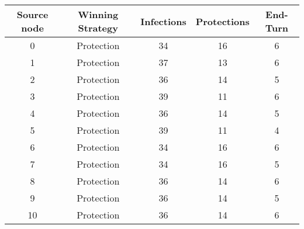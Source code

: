 \documentclass[results.tex]{subfiles}
\begin{document}
    \begin{center}
        \begin{tabular}{| c || c | c | c | c |}
            \hline
            {\bfseries Source node} & {\bfseries Winning Strategy} & {\bfseries Infections} & {\bfseries Protections}
            & {\bfseries End-Turn}
            \\  %
            \hline\hline
            0                       & Protection                   & 34                     & 16                      & 6                    \\
            \hline
            1                       & Protection                   & 37                     & 13                      & 6                    \\
            \hline
            2                       & Protection                   & 36                     & 14                      & 5                    \\
            \hline
            3                       & Protection                   & 39                     & 11                      & 6                    \\
            \hline
            4                       & Protection                   & 36                     & 14                      & 5                    \\
            \hline
            5                       & Protection                   & 39                     & 11                      & 4                    \\
            \hline
            6                       & Protection                   & 34                     & 16                      & 6                    \\
            \hline
            7                       & Protection                   & 34                     & 16                      & 5                    \\
            \hline
            8                       & Protection                   & 36                     & 14                      & 6                    \\
            \hline
            9                       & Protection                   & 36                     & 14                      & 5                    \\
            \hline
            10                      & Protection                   & 36                     & 14                      & 6                    \\

\end{tabular}
\end{center}
\end{document}
